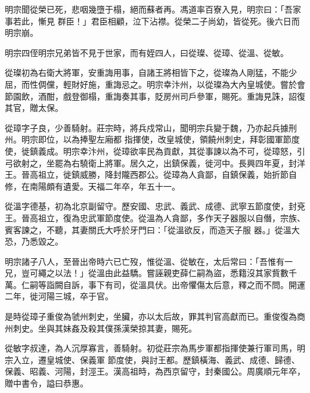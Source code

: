 \begin{pinyinscope}
 明宗聞從榮已死，悲咽幾墮于榻，絕而蘇者再。馮道率百寮入見，明宗曰：「吾家事若此，慚見
 群臣！」君臣相顧，泣下沾襟。從榮二子尚幼，皆從死。後六日而明宗崩。



 明宗四侄明宗兄弟皆不見于世家，而有姪四人，曰從璨、從璋、從溫、從敏。



 從璨初為右衛大將軍，安重誨用事，自諸王將相皆下之，從璨為人剛猛，不能少屈，而性倜儻，輕財好施，重誨忌之。明宗幸汴州，以從璨為大內皇城使。嘗於會節園飲，酒酣，戲登御榻，重誨奏其事，貶房州司戶參軍，賜死。重誨見誅，詔復其官，贈太保。



 從璋字子良，少善騎射。莊宗時，將兵戍常山，聞明宗兵變于魏，乃亦起兵據刑州。明宗即位，以為捧聖左廂都
 指揮使，改皇城使，領饒州刺史，拜彰國軍節度使，徙鎮義成。明宗幸汴州，從璋欲率民為貢獻，其從事諫以為不可，從璋怒，引弓欲射之，坐罷為右驍衛上將軍。居久之，出鎮保義，徙河中。長興四年夏，封洋王。晉高祖立，徙鎮威勝，降封隴西郡公。從璋為人貪鄙，自鎮保義，始折節自修，在南陽頗有遺愛。天福二年卒，年五十一。



 從溫字德基，初為北京副留守。歷安國、忠武、義武、成德、武寧五節度使，封兗王。晉高祖立，復為忠武軍節度使。從溫為人貪鄙，多作天子器服以自僭，宗族、賓客諫之，不聽，其妻關氏大呼於牙門曰：「從溫欲反，而造天子服
 器。」從溫大恐，乃悉毀之。



 明宗諸子八人，至晉出帝時六已亡歿，惟從溫、從敏在，太后常曰：「吾惟有一兄，豈可繩之以法！」從溫由此益驕。嘗誣親吏薛仁嗣為盜，悉籍沒其家貲數千萬。仁嗣等詣闕自訴，事下有司，從溫具伏。出帝懼傷太后意，釋之而不問。開運二年，徙河陽三城，卒于官。



 是時從璋子重俊為虢州刺史，坐臟，亦以太后故，罪其判官高獻而已。重俊復為商州刺史。坐與其妹姦及殺其僕孫漢榮掠其妻，賜死。



 從敏字叔達，為人沉厚寡言，善騎射。初從莊宗為馬步軍都指揮使兼行軍司馬，明宗入立，遷皇城使、保義軍
 節度使，與討王都。歷鎮橫海、義武、成德、歸德、保義、昭義、河陽，封涇王。漢高祖時，為西京留守，封秦國公。周廣順元年卒，贈中書令，謚曰恭惠。



\end{pinyinscope}
